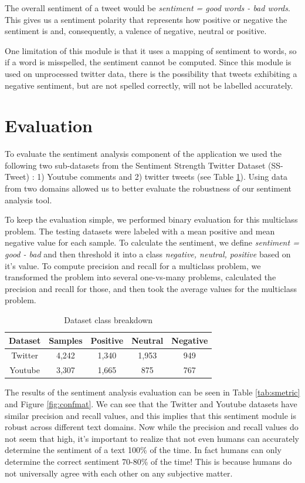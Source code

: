 The overall sentiment of a tweet would be {\em sentiment = good words - bad words}. This gives us a sentiment polarity that represents how positive or negative the sentiment is and, consequently, a valence of negative, neutral or positive.

One limitation of this module is that it uses a mapping of sentiment to words, so if a word is misspelled, the sentiment cannot be computed. Since this module is used on unprocessed twitter data, there is the possibility that tweets exhibiting a negative sentiment, but are not spelled correctly, will not be labelled accurately.

\section{Evaluation}
To evaluate the sentiment analysis component of the application we used the following two sub-datasets from the Sentiment Strength Twitter Dataset (SS-Tweet) \cite{saif2013evaluation}: 1) Youtube comments and 2) twitter tweets (see Table \ref{tab:cdescr}). Using data from two domains allowed us to better evaluate the robustness of our sentiment analysis tool. 

To keep the evaluation simple, we performed binary evaluation for this multiclass problem. 
The testing datasets were labeled with a mean positive and mean negative value for each sample. To calculate the sentiment, we define {\em sentiment = good - bad} and then threshold it into a class {\em negative, neutral, positive} based on it's value.
To compute precision and recall for a multiclass problem, we transformed the problem into several one-vs-many problems, calculated the precision and recall for those, and then took the average values for the multiclass problem.

\begin{table}[!ht]
\centering
\begin{tabular}{|c|c|c|c|c|} \hline
\textbf{Dataset} & \textbf{Samples} & \textbf{Positive} & \textbf{Neutral} &\textbf{Negative} \\ \hline \hline
Twitter & 4,242 & 1,340 & 1,953 & 949 \\ \hline
Youtube & 3,307 & 1,665 & 875 & 767 \\ \hline
\end{tabular}
\caption{Dataset class breakdown}
\label{tab:cdescr}
\end{table}

The results of the sentiment analysis evaluation can be seen in Table \ref{tab:smetric} and Figure \ref{fig:confmat}. We can see that the Twitter and Youtube datasets have similar precision and recall values, and this implies that this sentiment module is robust across different text domains.
Now while the precision and recall values do not seem that high, it's important to realize that not even humans can accurately determine the sentiment of a text 100\% of the time. In fact humans can only determine the correct sentiment 70-80\% \cite{sent2}\cite{sent1}\cite{mashable} of the time! This is because humans do not universally agree with each other on any subjective matter.

